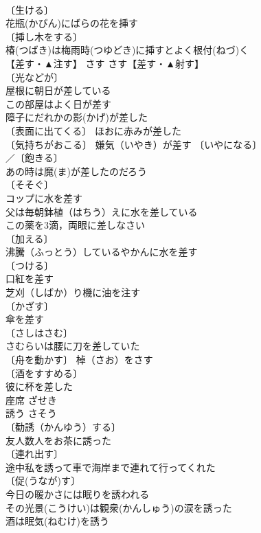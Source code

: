 \documentclass[8pt]{extreport}
\begin{document}
\begin{CJK}{UTF8}{min}
\\	〔生ける〕
\\	花瓶(かびん)にばらの花を挿す 
\\	〔挿し木をする〕
\\	椿(つばき)は梅雨時(つゆどき)に挿すとよく根付(ねづ)く 
\\	【差す・▲注す】	さす	さす【差す・▲射す】 
\\	〔光などが〕
\\	屋根に朝日が差している 
\\	この部屋はよく日が差す 
\\	障子にだれかの影(かげ)が差した 
\\	〔表面に出てくる〕 ほおに赤みが差した 
\\	〔気持ちがおこる〕 嫌気（いやき）が差す 〔いやになる〕
\\	／〔飽きる〕
\\	あの時は魔(ま)が差したのだろう 
\\	〔そそぐ〕
\\	コップに水を差す 
\\	父は毎朝鉢植（はちう）えに水を差している 
\\	この薬を3滴，両眼に差しなさい 
\\	〔加える〕
\\	沸騰（ふっとう）しているやかんに水を差す 
\\	〔つける〕
\\	口紅を差す 
\\	芝刈（しばか）り機に油を注す 
\\	〔かざす〕
\\	傘を差す 
\\	〔さしはさむ〕　
\\	さむらいは腰に刀を差していた 
\\	〔舟を動かす〕 棹（さお）をさす 
\\	〔酒をすすめる〕　
\\	彼に杯を差した 
\\	座席	ざせき	
\\	誘う	さそう	
\\	〔勧誘（かんゆう）する〕
\\	友人数人をお茶に誘った 
\\	〔連れ出す〕　
\\	途中私を誘って車で海岸まで連れて行ってくれた 
\\	〔促(うなが)す〕
\\	今日の暖かさには眠りを誘われる 
\\	その光景(こうけい)は観衆(かんしゅう)の涙を誘った 
\\	酒は眠気(ねむけ)を誘う 

\end{CJK}
\end{document}
